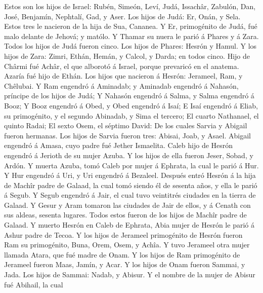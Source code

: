  Estos son los hijos de Israel: Rubén, Simeón, Leví, Judá,
Issachâr, Zabulón,  Dan, José, Benjamín, Nephtalí, Gad, y
Aser.  Los hijos de Judá: Er, Onán, y Sela. Estos tres le
nacieron de la hija de Sua, Cananea. Y Er, primogénito de Judá, fué malo
delante de Jehová; y matólo.  Y Thamar su nuera le parió á
Phares y á Zara. Todos los hijos de Judá fueron cinco. 
Los hijos de Phares: Hesrón y Hamul.  Y los hijos de Zara:
Zimri, Ethán, Hemán, y Calcol, y Darda; en todos cinco. 
Hijo de Chârmi fué Achâr, el que alborotó á Israel, porque prevaricó en
el anatema.  Azaría fué hijo de Ethán.  Los
hijos que nacieron á Hesrón: Jerameel, Ram, y Chêlubai. 
Y Ram engendró á Aminadab; y Aminadab engendró á Nahasón, príncipe de
los hijos de Judá;  Y Nahasón engendró á Salma, y Salma
engendró á Booz;  Y Booz engendró á Obed, y Obed engendró
á Isaí;  E Isaí engendró á Eliab, su primogénito, y el
segundo Abinadab, y Sima el tercero;  El cuarto
Nathanael, el quinto Radai;  El sexto Osem, el séptimo
David:  De los cuales Sarvia y Abigail fueron hermanas.
Los hijos de Sarvia fueron tres: Abisai, Joab, y Asael. 
Abigail engendró á Amasa, cuyo padre fué Jether Ismaelita.
 Caleb hijo de Hesrón engendró á Jerioth de su mujer
Azuba. Y los hijos de ella fueron Jeser, Sobad, y Ardón. 
Y muerta Azuba, tomó Caleb por mujer á Ephrata, la cual le parió á Hur.
 Y Hur engendró á Uri, y Uri engendró á Bezaleel.
 Después entró Hesrón á la hija de Machîr padre de
Galaad, la cual tomó siendo él de sesenta años, y ella le parió á Segub.
 Y Segub engendró á Jair, el cual tuvo veintitrés
ciudades en la tierra de Galaad.  Y Gesur y Aram tomaron
las ciudades de Jair de ellos, y á Cenath con sus aldeas, sesenta
lugares. Todos estos fueron de los hijos de Machîr padre de Galaad.
 Y muerto Hesrón en Caleb de Ephrata, Abia mujer de
Hesrón le parió á Ashur padre de Tecoa.  Y los hijos de
Jerameel primogénito de Hesrón fueron Ram su primogénito, Buna, Orem,
Osem, y Achîa.  Y tuvo Jerameel otra mujer llamada Atara,
que fué madre de Onam.  Y los hijos de Ram primogénito de
Jerameel fueron Maas, Jamín, y Acar.  Y los hijos de Onam
fueron Sammai, y Jada. Los hijos de Sammai: Nadab, y Abisur.
 Y el nombre de la mujer de Abisur fué Abihail, la cual
